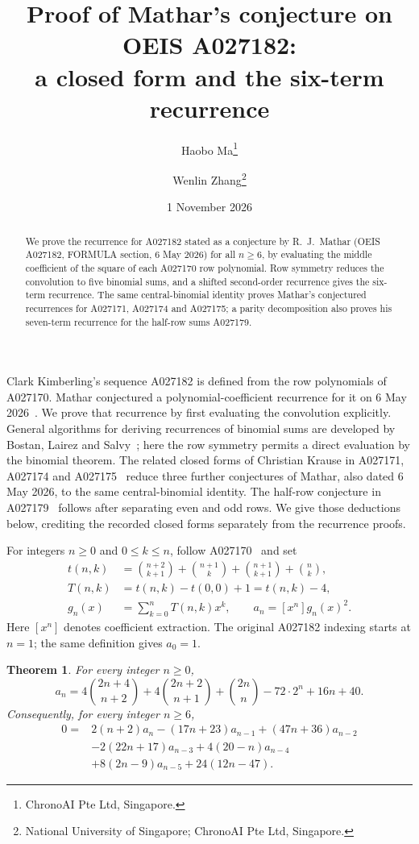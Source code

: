 \documentclass[11pt]{article}
\title{Proof of Mathar's conjecture on OEIS A027182:\\
a closed form and the six-term recurrence}
\author{Haobo Ma\thanks{ChronoAI Pte Ltd, Singapore.}\and
Wenlin Zhang\thanks{National University of Singapore; ChronoAI Pte Ltd, Singapore.}}
\date{1 November 2026}
\newtheorem{theorem}{Theorem}
\newcommand{\bin}[2]{\binom{#1}{#2}}
\begin{document}
\maketitle
\begin{abstract}
We prove the recurrence for A027182 stated as a conjecture by R.\ J.\ Mathar
(OEIS A027182, FORMULA section, 6 May 2026) for all $n\geq6$, by evaluating
the middle coefficient of the square of each A027170 row polynomial.
Row symmetry reduces the convolution to five binomial sums, and a shifted
second-order recurrence gives the six-term recurrence. The same
central-binomial identity proves Mathar's conjectured recurrences for
A027171, A027174 and A027175; a parity decomposition also proves his
seven-term recurrence for the half-row sums A027179.
\end{abstract}

Clark Kimberling's sequence A027182 is defined from the row polynomials
of A027170. Mathar conjectured a polynomial-coefficient recurrence for
it on 6 May 2026~\cite{A027182}. We prove that recurrence by first
evaluating the convolution explicitly. General algorithms for deriving
recurrences of binomial sums are developed by Bostan, Lairez and
Salvy~\cite[Introduction and \S4]{BLS}; here the row symmetry permits
a direct evaluation by the binomial theorem.
The related closed forms of Christian Krause in A027171, A027174 and
A027175~\cite{A027171,A027174,A027175} reduce three further conjectures of
Mathar, also dated 6 May 2026, to the same central-binomial identity.
The half-row conjecture in A027179~\cite{A027179} follows after separating
even and odd rows. We give those deductions below, crediting the recorded
closed forms separately from the recurrence proofs.

For integers $n\geq0$ and $0\leq k\leq n$, follow A027170~\cite{A027170}
and set
\begin{align*}
t(n,k)&=\bin{n+2}{k+1}+\bin{n+1}{k}+\bin{n+1}{k+1}+\bin nk,\\
T(n,k)&=t(n,k)-t(0,0)+1=t(n,k)-4,\\
g_n(x)&=\sum_{k=0}^n T(n,k)x^k,\qquad a_n=[x^n]g_n(x)^2.
\end{align*}
Here $[x^n]$ denotes coefficient extraction. The original A027182
indexing starts at $n=1$; the same definition gives $a_0=1$.

\begin{theorem}\label{thm:main}
For every integer $n\geq0$,
\begin{equation}\label{eq:closed}
a_n=4\bin{2n+4}{n+2}+4\bin{2n+2}{n+1}+\bin{2n}{n}
       -72\cdot2^n+16n+40.
\end{equation}
Consequently, for every integer $n\geq6$,
\begin{equation}\label{eq:rec}
\begin{aligned}
0={}&2(n+2)a_n-(17n+23)a_{n-1}+(47n+36)a_{n-2}\\
 &-2(22n+17)a_{n-3}+4(20-n)a_{n-4}\\
 &+8(2n-9)a_{n-5}+24(12n-47).
\end{aligned}
\end{equation}
\end{theorem}
\end{document}
